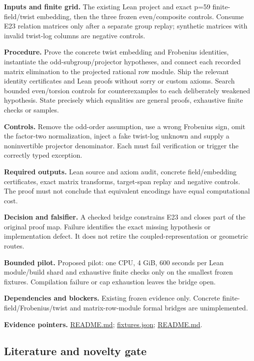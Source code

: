 \documentclass[
  10pt,
]{article}
\begin{document}
\textbf{Inputs and finite grid.} The existing Lean project and exact
p=59 finite-field/twist embedding, then the three frozen even/composite
controls. Consume E23 relation matrices only after a separate group
replay; synthetic matrices with invalid twist-log columns are negative
controls.

\textbf{Procedure.} Prove the concrete twist embedding and Frobenius
identities, instantiate the odd-subgroup/projector hypotheses, and
connect each recorded matrix elimination to the projected rational row
module. Ship the relevant identity certificates and Lean proofs without
sorry or custom axioms. Search bounded even/torsion controls for
counterexamples to each deliberately weakened hypothesis. State
precisely which equalities are general proofs, exhaustive finite checks
or samples.

\textbf{Controls.} Remove the odd-order assumption, use a wrong
Frobenius sign, omit the factor-two normalization, inject a fake
twist-log unknown and supply a noninvertible projector denominator. Each
must fail verification or trigger the correctly typed exception.

\textbf{Required outputs.} Lean source and axiom audit, concrete
field/embedding certificates, exact matrix transforms, target-span
replay and negative controls. The proof must not conclude that
equivalent encodings have equal computational cost.

\textbf{Decision and falsifier.} A checked bridge constrains E23 and
closes part of the original proof map. Failure identifies the exact
missing hypothesis or implementation defect. It does not retire the
coupled-representation or geometric routes.

\textbf{Bounded pilot.} Proposed pilot: one CPU, 4 GiB, 600 seconds per
Lean module/build shard and exhaustive finite checks only on the
smallest frozen fixtures. Compilation failure or cap exhaustion leaves
the bridge open.

\textbf{Dependencies and blockers.} Existing frozen evidence only.
Concrete finite-field/Frobenius/twist and matrix-row-module formal
bridges are unimplemented.

\textbf{Evidence pointers.}
\href{../../../research/twist_routes_1_3_20261021/lean/README.md}{README.md};
\href{../../../research/twist_routes_1_3_20261021/execution-v1/fixtures.json}{fixtures.json};
\href{../../../docs/identity-certificates/README.md}{README.md}.

\subsection{Literature and novelty
gate}\label{literature-and-novelty-gate}
\end{document}
